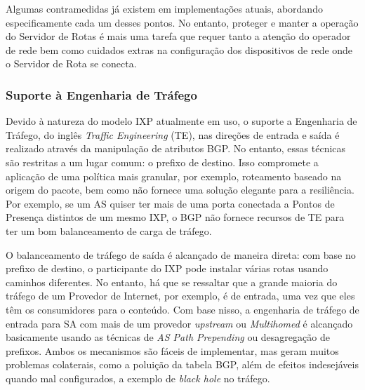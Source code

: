 \documentclass[12pt]{article}
\begin{document}
Algumas contramedidas já existem em implementações atuais, abordando especificamente cada um desses pontos. No entanto, proteger e manter a operação do Servidor de Rotas é mais uma tarefa que requer tanto a atenção do operador de rede bem como cuidados extras na configuração dos dispositivos de rede onde o Servidor de Rota se conecta.


\subsubsection{Suporte à Engenharia de Tráfego}
Devido à natureza do modelo IXP atualmente em uso, o suporte a Engenharia de Tráfego, do inglês \textit{Traffic Engineering} (TE), nas direções de entrada e saída é realizado através da manipulação de atributos BGP. No entanto, essas técnicas são restritas a um lugar comum: o prefixo de destino. Isso compromete a aplicação de uma política mais granular, por exemplo, roteamento baseado na origem do pacote, bem como não fornece uma solução elegante para a resiliência. Por exemplo, se um AS quiser ter mais de uma porta conectada a Pontos de Presença distintos de um mesmo IXP, o BGP não fornece recursos de TE para ter um bom balanceamento de carga de tráfego.


O balanceamento de tráfego de saída é alcançado de maneira direta: com base no prefixo de destino, o participante do IXP pode instalar várias rotas usando caminhos diferentes. No entanto, há que se ressaltar que a grande maioria do tráfego de um Provedor de Internet, por exemplo, é de entrada, uma vez que eles têm os consumidores para o conteúdo. Com base nisso, a engenharia de tráfego de entrada para SA com mais de um provedor \textit{upstream} ou \textit{Multihomed} é alcançado basicamente usando as técnicas de \textit{AS Path Prepending} ou desagregação de prefixos. Ambos os mecanismos são fáceis de implementar, mas geram muitos problemas colaterais, como a poluição da tabela BGP, além de efeitos indesejáveis quando mal configurados, a exemplo de \textit{black hole} no tráfego.
\end{document}
